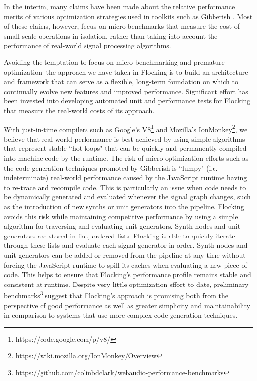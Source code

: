 \documentclass{article}
\begin{document}
In the interim, many claims have been made about the relative performance merits of various optimization strategies used in toolkits such as Gibberish \cite{roberts_web_2013}. Most of these claims, however, focus on micro-benchmarks that measure the cost of small-scale operations in isolation, rather than taking into account the performance of real-world signal processing algorithms.

Avoiding the temptation to focus on micro-benchmarking and premature optimization, the approach we have taken in Flocking is to build an architecture and framework that can serve as a flexible, long-term foundation on which to continually evolve new features and improved performance. Significant effort has been invested into developing automated unit and performance tests for Flocking that measure the real-world costs of its approach.

With just-in-time compilers such as Google's V8\footnote{https://code.google.com/p/v8/} and Mozilla's IonMonkey\footnote{https://wiki.mozilla.org/IonMonkey/Overview}, we believe that real-world performance is best achieved by using simple algorithms that represent stable ``hot loops" that can be quickly and permanently  compiled into machine code by the runtime. The risk of micro-optimization efforts such as the code-generation techniques promoted by Gibberish is ``lumpy" (i.e. indeterminate) real-world performance caused by the JavaScript runtime having to re-trace and recompile code. This is particularly an issue when code needs to be dynamically generated and evaluated whenever the signal graph changes, such as the introduction of new synths or unit generators into the pipeline. Flocking avoids this risk while maintaining competitive performance by using a simple algorithm for traversing and evaluating unit generators. Synth nodes and unit generators are stored in flat, ordered lists. Flocking is able to quickly iterate through these lists and evaluate each signal generator in order. Synth nodes and unit generators can be added or removed from the pipeline at any time without forcing the JavaScript runtime to spill its caches when evaluating a new piece of code. This helps to ensure that Flocking's performance profile remains stable and consistent at runtime. Despite very little optimization effort to date, preliminary benchmarks\footnote{https://github.com/colinbdclark/webaudio-performance-benchmarks} suggest that Flocking's approach is promising both from the perspective of good performance as well as greater simplicity and maintainability in comparison to systems that use more complex code generation techniques.
\end{document}
